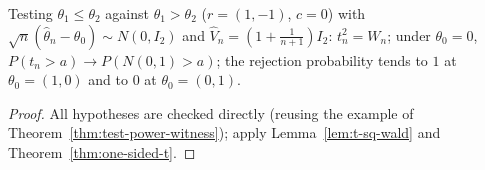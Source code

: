 \begin{theorem}[Example]
\label{thm:one-sided-t-witness}
\leanok
{}
Testing $\theta_1\le\theta_2$ against $\theta_1 > \theta_2$ ($r = (1,-1)$, $c = 0$) with
$\sqrt n(\hat\theta_n-\theta_0)\sim N(0,I_2)$ and $\hat V_n = (1+\frac1{n+1})I_2$: $t_n^2 = W_n$; under $\theta_0 = 0$,
$P(t_n > a)\to P(N(0,1) > a)$; the rejection probability tends to $1$ at $\theta_0 = (1,0)$ and to $0$ at
$\theta_0 = (0,1)$.
\end{theorem}
\begin{proof}
\leanok
All hypotheses are checked directly (reusing the example of Theorem~\ref{thm:test-power-witness}); apply
Lemma~\ref{lem:t-sq-wald} and Theorem~\ref{thm:one-sided-t}.
\end{proof}
